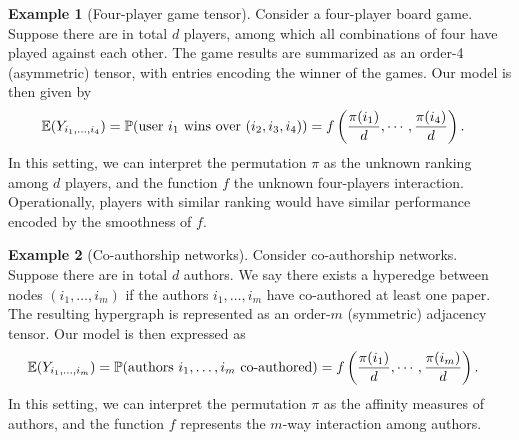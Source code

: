 \documentclass{article}
\theoremstyle{definition}
\newtheorem{example}{Example}
\begin{document}
\begin{example}[Four-player game tensor] Consider a four-player board game. Suppose there are in total $d$ players, among which all combinations of four have played against each other. The game results are summarized as an order-4 (asymmetric) tensor, with entries encoding the winner of the games. Our model is then given by
\begin{align}
\mathbb{E}(Y_{i_1,\ldots,i_4})&=\mathbb{P}(\text{user $i_1$ wins over $(i_2,i_3,i_4)$})
=f\left({\pi(i_1)\over d},\cdots, {\pi(i_4)\over d}\right).
\end{align}
In this setting, we can interpret the permutation $\pi$ as the unknown ranking among $d$ players, and the function $f$ the unknown four-players interaction. Operationally, players with similar ranking would have similar performance encoded by the smoothness of $f$. 
\end{example}

\begin{example}[Co-authorship networks] Consider co-authorship networks. Suppose there are in total $d$ authors. We say there exists a hyperedge between nodes $(i_1,\ldots,i_m)$ if the authors $i_1,\ldots,i_m$ have co-authored at least one paper. The resulting hypergraph is represented as an order-$m$ (symmetric) adjacency tensor. Our model is then expressed as
\begin{align}
    \mathbb{E}(Y_{i_1,\ldots,i_m})&=\mathbb{P}(\text{authors $i_1,\ldots,i_m$ co-authored})
=f\left({\pi(i_1)\over d},\cdots, {\pi(i_m)\over d}\right).
\end{align}
In this setting, we can interpret the permutation $\pi$ as the affinity measures of authors, and the function $f$ represents the $m$-way interaction among authors.
\end{example}



\end{document}
